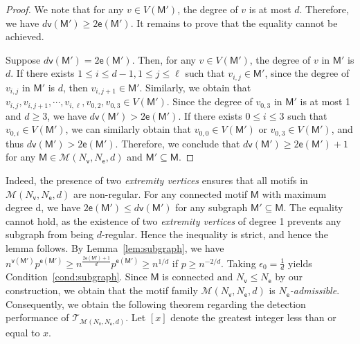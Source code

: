 \documentclass[letterpaper,11pt]{article}
\theoremstyle{definition}
\newcommand{\maM}{\mathcal{M}}
\newcommand{\maT}{\mathcal{T}}
\newcommand{\en}{\mathsf{{e}}}
\newcommand{\vn}{\mathsf{{v}}}
\newcommand{\sfM}{{\mathsf{M}}}
\newcommand{\sfe}{{\mathsf{e}}}
\newcommand{\sfv}{{\mathsf{v}}}
\begin{document}
\begin{proof}

We note that for any $v\in V(\sfM')$, the degree of $v$ is at most $d$. Therefore, we have $d \vn(\sfM')\ge 2 \en(\sfM')$. It remains to prove that the equality cannot be achieved.

    Suppose $d\vn(\sfM') = 2\en(\sfM')$. Then, for any $v\in V(\sfM')$, the degree of $v$ in $\sfM'$ is $d$. If there exists $1\le i\le d-1,1\le j\le \ell$ such that $v_{i,j}\in \sfM'$, since the degree of $v_{i,j}$ in $\sfM'$ is $d$, then $v_{i,{j+1}} \in \sfM'$. Similarly, we obtain that $v_{i,j},v_{i,j+1},\cdots, v_{i,\ell},v_{0,2},v_{0,3}\in V(\sfM')$. Since the degree of $v_{0,3}$ in $\sfM'$ is at most 1 and $d\ge 3$, we have $d\vn(\sfM')>2\en(\sfM')$. If there exists $0\le i\le 3$ such that $v_{0,i}\in V(\sfM')$, we can similarly obtain that $v_{0,0}\in V(\sfM')$ or $v_{0,3}\in V(\sfM')$, and thus $d\vn(\sfM')>2\en(\sfM')$. Therefore, we conclude that $d\vn(\sfM')\ge 2\en(\sfM')+1$ for any $\sfM\in \maM(N_\sfv,N_\sfe,d)$ and $\sfM'\subseteq \sfM$.
\end{proof}

Indeed, the presence of two \emph{extremity vertices} ensures that all motifs in \(\mathcal{M}(N_\sfv, N_\sfe, d)\) are non-regular.
For any connected motif $\mathsf{M}$ with maximum degree d, we have $2\en(\mathsf{M}')  \le d\vn(\mathsf{M}')$ for any subgraph $\mathsf{M}'\subseteq \mathsf{M}$.
The equality cannot hold, as the existence of two \emph{extremity vertices} of degree 1 prevents any subgraph from being $d$-regular.
Hence the inequality is strict, and hence the lemma follows.
By Lemma~\ref{lem:subgraph}, we have $n^{\vn(\sfM')}p^{\en(\sfM')}\ge n^{\frac{2\en(\sfM')+1}{d}}p^{\en(\sfM')}\ge n^{1/d}$ if $p\ge n^{-2/d}$. Taking $\epsilon_0 = \frac{1}{d}$ yields Condition~\ref{cond:subgraph}. Since $\sfM$ is connected and $N_\sfv\le N_\sfe$ by our construction, we obtain that the motif family $\maM(N_\sfv,N_\sfe,d)$ is \emph{$N_\sfe$-admissible}. Consequently, we obtain the following theorem regarding the detection performance of $\maT_{\maM(N_\sfv,N_\sfe,d)}$.
Let $[x]$ denote the greatest integer less than or equal to $x$.
\end{document}
